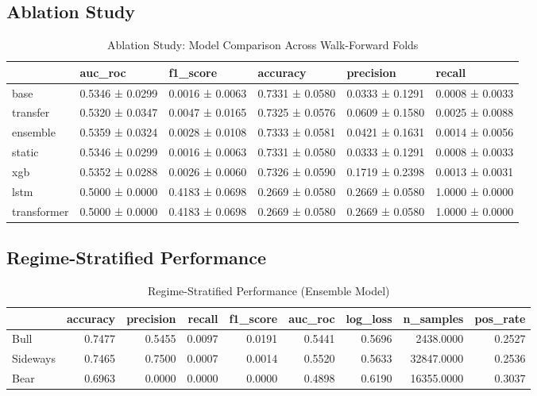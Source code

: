\documentclass[12pt,a4paper]{article}
\begin{document}
\subsection{Ablation Study}

\begin{table}
\caption{Ablation Study: Model Comparison Across Walk-Forward Folds}
\label{tab:ablation}
\begin{tabular}{llllll}
\toprule
 & auc_roc & f1_score & accuracy & precision & recall \\
\midrule
base & 0.5346 ± 0.0299 & 0.0016 ± 0.0063 & 0.7331 ± 0.0580 & 0.0333 ± 0.1291 & 0.0008 ± 0.0033 \\
transfer & 0.5320 ± 0.0347 & 0.0047 ± 0.0165 & 0.7325 ± 0.0576 & 0.0609 ± 0.1580 & 0.0025 ± 0.0088 \\
ensemble & 0.5359 ± 0.0324 & 0.0028 ± 0.0108 & 0.7333 ± 0.0581 & 0.0421 ± 0.1631 & 0.0014 ± 0.0056 \\
static & 0.5346 ± 0.0299 & 0.0016 ± 0.0063 & 0.7331 ± 0.0580 & 0.0333 ± 0.1291 & 0.0008 ± 0.0033 \\
xgb & 0.5352 ± 0.0288 & 0.0026 ± 0.0060 & 0.7326 ± 0.0590 & 0.1719 ± 0.2398 & 0.0013 ± 0.0031 \\
lstm & 0.5000 ± 0.0000 & 0.4183 ± 0.0698 & 0.2669 ± 0.0580 & 0.2669 ± 0.0580 & 1.0000 ± 0.0000 \\
transformer & 0.5000 ± 0.0000 & 0.4183 ± 0.0698 & 0.2669 ± 0.0580 & 0.2669 ± 0.0580 & 1.0000 ± 0.0000 \\
\bottomrule
\end{tabular}
\end{table}


\subsection{Regime-Stratified Performance}

\begin{table}
\caption{Regime-Stratified Performance (Ensemble Model)}
\label{tab:regime}
\begin{tabular}{lrrrrrrrr}
\toprule
 & accuracy & precision & recall & f1_score & auc_roc & log_loss & n_samples & pos_rate \\
\midrule
Bull & 0.7477 & 0.5455 & 0.0097 & 0.0191 & 0.5441 & 0.5696 & 2438.0000 & 0.2527 \\
Sideways & 0.7465 & 0.7500 & 0.0007 & 0.0014 & 0.5520 & 0.5633 & 32847.0000 & 0.2536 \\
Bear & 0.6963 & 0.0000 & 0.0000 & 0.0000 & 0.4898 & 0.6190 & 16355.0000 & 0.3037 \\
\bottomrule
\end{tabular}
\end{table}
\end{document}

